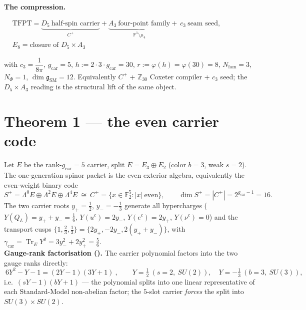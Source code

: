 \documentclass[11pt,a4paper]{article}
\newcommand{\gcar}{g_{\mathrm{car}}}
\newcommand{\Nfam}{N_{\mathrm{fam}}}
\newcommand{\cthree}{c_3}
\newcommand{\dimg}{\dim\mathfrak g_{\mathrm{SM}}}
\theoremstyle{definition}
\begin{document}
\par\medskip\noindent\textbf{The compression.}
\begin{keyeq}
$\displaystyle \begin{aligned}
   &\text{TFPT}=\underbrace{D_5\ \text{half-spin carrier}}_{C^+}+\underbrace{A_3\ \text{four-point family}}_{\mathbb P^1\setminus\mu_4}+\ \cthree\ \text{seam seed},\\
   &E_8=\text{closure of }D_5\times A_3
  \end{aligned}$
\end{keyeq}
\noindent with $\cthree=\dfrac{1}{8\pi}$, $\gcar=5$, $h:=2\cdot3\cdot\gcar=30$, $r:=\varphi(h)=\varphi(30)=8$,
$\Nfam=3$, $N_\Phi=1$, $\dimg=12$. Equivalently $C^+$ + $\mathbb Z_{30}$ Coxeter compiler + $\cthree$
seed; the $D_5\times A_3$ reading is the structural lift of the same object.

\section*{Theorem 1 --- the even carrier code}
Let $E$ be the rank-$\gcar=5$ carrier, split $E=E_3\oplus E_2$ (color $b=3$, weak $s=2$). The
one-generation spinor packet is the even exterior algebra, equivalently the even-weight binary code
\begin{equation}
  S^+=\Lambda^0E\oplus\Lambda^2E\oplus\Lambda^4E\ \cong\ C^+=\{x\in\mathbb F_2^5:|x|\ \text{even}\},\qquad
  \dim S^+=|C^+|=2^{\gcar-1}=16 .
\end{equation}
The two carrier roots $y_+=\tfrac12$, $y_-=-\tfrac13$ generate all hypercharges
($Y(Q_L)=y_++y_-=\tfrac16$, $Y(u^c)=2y_-$, $Y(e^c)=2y_+$, $Y(\nu^c)=0$) and the transport cusps
$\{1,\tfrac23,\tfrac13\}=\{2y_+,-2y_-,2(y_++y_-)\}$, with $\gamma_{\mathrm{car}}=\operatorname{Tr}_EY^2=3y_-^2+2y_+^2=\tfrac56$. \mE
\smallskip\\
\noindent\textbf{Gauge-rank factorisation ().} The carrier polynomial factors
into the two gauge ranks directly:
\[
  \boxed{\ 6Y^2-Y-1=(2Y-1)(3Y+1)\ },\qquad Y=\tfrac12\ (s{=}2,\ SU(2)),\quad Y=-\tfrac13\ (b{=}3,\ SU(3)),
\]
i.e.\ $(sY-1)(bY+1)$ --- the polynomial splits into one linear representative of each Standard-Model
non-abelian factor; the $5$-slot carrier \emph{forces} the split into $SU(3)\times SU(2)$.
\end{document}
